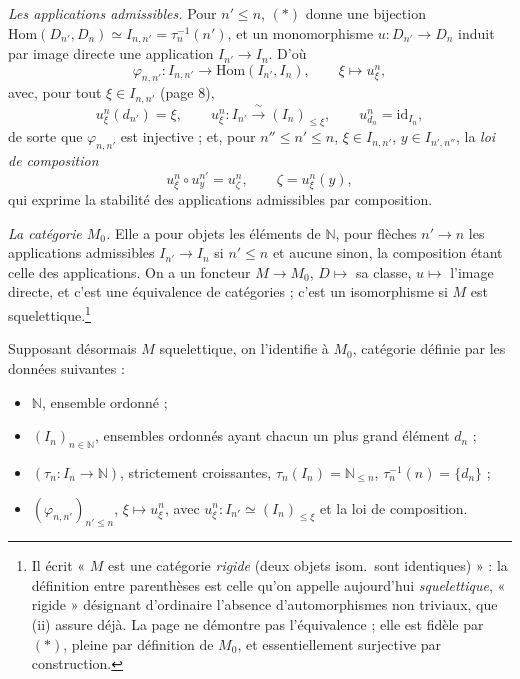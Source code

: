 \documentclass[11pt,a4paper]{article}
\begin{document}
\emph{Les applications admissibles.} Pour $n' \leq n$, $(*)$ donne une bijection
$\mathrm{Hom}(D_{n'}, D_{n}) \simeq I_{n,n'} = \tau_{n}^{-1}(n')$, et un
monomorphisme $u : D_{n'} \to D_{n}$ induit par image directe une application
$I_{n'} \to I_{n}$. D'où
\[
\varphi_{n,n'} : I_{n,n'} \longrightarrow \mathrm{Hom}(I_{n'}, I_{n}),
\qquad \xi \longmapsto u^{n}_{\xi},
\]
avec, pour tout $\xi \in I_{n,n'}$ (page 8),
\[
u^{n}_{\xi}(d_{n'}) = \xi, \qquad
u^{n}_{\xi} : I_{n'} \xrightarrow{\;\sim\;} (I_{n})_{\leq \xi}, \qquad
u^{n}_{d_{n}} = \mathrm{id}_{I_{n}},
\]
de sorte que $\varphi_{n,n'}$ est injective ; et, pour
$n'' \leq n' \leq n$, $\xi \in I_{n,n'}$, $y \in I_{n',n''}$, la \emph{loi de
composition}
\[
u^{n}_{\xi} \circ u^{n'}_{y} = u^{n}_{\zeta}, \qquad \zeta = u^{n}_{\xi}(y),
\]
qui exprime la stabilité des applications admissibles par composition.

\emph{La catégorie $M_{0}$.} Elle a pour objets les éléments de $\mathbb{N}$,
pour flèches $n' \to n$ les applications admissibles $I_{n'} \to I_{n}$ si
$n' \leq n$ et aucune sinon, la composition étant celle des applications. On a
un foncteur $M \to M_{0}$, $D \mapsto$ sa classe, $u \mapsto$ l'image directe,
et c'est une équivalence de catégories ; c'est un isomorphisme si $M$ est
squelettique.\footnote{Il écrit « $M$ est une catégorie \emph{rigide} (deux
objets isom.\ sont identiques) » : la définition entre parenthèses est celle
qu'on appelle aujourd'hui \emph{squelettique}, « rigide » désignant d'ordinaire
l'absence d'automorphismes non triviaux, que (ii) assure déjà. La page ne
démontre pas l'équivalence ; elle est fidèle par $(*)$, pleine par définition
de $M_{0}$, et essentiellement surjective par construction.}

Supposant désormais $M$ squelettique, on l'identifie à $M_{0}$, catégorie
définie par les données suivantes :
\begin{itemize}
\item $\mathbb{N}$, ensemble ordonné ;
\item $(I_{n})_{n \in \mathbb{N}}$, ensembles ordonnés ayant chacun un plus grand
élément $d_{n}$ ;
\item $(\tau_{n} : I_{n} \to \mathbb{N})$, strictement croissantes,
$\tau_{n}(I_{n}) = \mathbb{N}_{\leq n}$, $\tau_{n}^{-1}(n) = \{d_{n}\}$ ;
\item $(\varphi_{n,n'})_{n' \leq n}$, $\xi \mapsto u^{n}_{\xi}$, avec
$u^{n}_{\xi} : I_{n'} \simeq (I_{n})_{\leq \xi}$ et la loi de composition.
\end{itemize}
\end{document}
